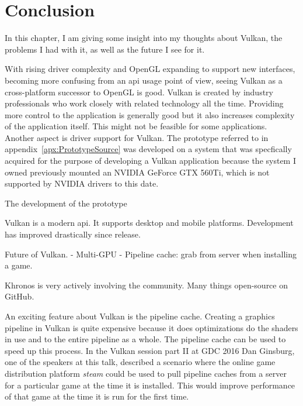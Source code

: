 
\chapter{Conclusion}
\label{cha:Conclusion}
  \tbd

  In this chapter, I am giving some insight into my thoughts about Vulkan, the problems I had with it, as well as the future I see for it.

  With rising driver complexity and OpenGL expanding to support new interfaces, becoming more confusing from an \gls{api} usage point of view, seeing Vulkan as a cross-platform successor to OpenGL is good.
  Vulkan is created by industry professionals who work closely with related technology all the time.
  Providing more control to the application is generally good but it also increases complexity of the application itself.
  This might not be feasible for some applications.
  Another aspect is driver support for Vulkan.
  The prototype referred to in appendix~\ref{apx:PrototypeSource} was developed on a system that was specfically acquired for the purpose of developing a Vulkan application because the system I owned previously mounted an NVIDIA GeForce GTX 560Ti, which is not supported by NVIDIA drivers to this date.

  The development of the prototype

  Vulkan is a modern api.
  It supports desktop and mobile platforms.
  Development has improved drastically since release.

  Future of Vulkan.
    - Multi-GPU
    - Pipeline cache: grab from server when installing a game.

  Khronos is very actively involving the community.
  Many things open-source on GitHub.

  An exciting feature about Vulkan is the pipeline cache.
  Creating a graphics pipeline in Vulkan is quite expensive because it does optimizations do the shaders in use and to the entire pipeline as a whole.
  The pipeline cache can be used to speed up this process.
  In the Vulkan session part II at GDC 2016\cite{vksessiongdc16} Dan Ginsburg, one of the speakers at this talk, described a scenario where the online game distribution platform \textit{steam} could be used to pull pipeline caches from a server for a particular game at the time it is installed.
  This would improve performance of that game at the time it is run for the first time.

